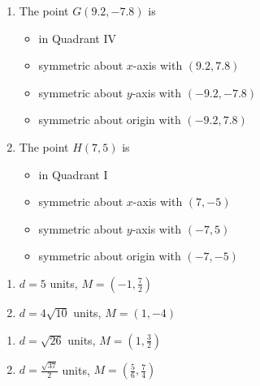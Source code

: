 \begin{enumerate}
\begin{multicols}{2}
\begin{enumerate}
\item The point $G(9.2, -7.8)$ is 

\begin{itemize}

\item in Quadrant IV
\item symmetric about $x$-axis with $(9.2, 7.8)$
\item symmetric about $y$-axis with {\scriptsize $(-9.2, -7.8)$}
\item symmetric about origin with $(-9.2, 7.8)$

\end{itemize}

\item The point $H(7, 5)$ is 

\begin{itemize}

\item in Quadrant I
\item symmetric about $x$-axis with $(7, -5)$
\item symmetric about $y$-axis with $(-7, 5)$
\item symmetric about origin with $(-7, -5)$

\end{itemize}

\end{enumerate}
\end{multicols}
\setcounter{HW}{\value{enumi}}
\end{enumerate}


\begin{multicols}{2}
\begin{enumerate}
\setcounter{enumi}{\value{HW}}

\item $d = 5$ units, $M = \left(-1, \frac{7}{2} \right)$
\item $d = 4 \sqrt{10}$ units, $M = \left(1, -4 \right)$

\setcounter{HW}{\value{enumi}}
\end{enumerate}
\end{multicols}

\begin{multicols}{2}
\begin{enumerate}
\setcounter{enumi}{\value{HW}}

\item $d = \sqrt{26}$ units, $M = \left(1, \frac{3}{2} \right)$
\item $d= \frac{\sqrt{37}}{2}$ units, $M = \left(\frac{5}{6}, \frac{7}{4} \right)$

\setcounter{HW}{\value{enumi}}
\end{enumerate}
\end{multicols}

